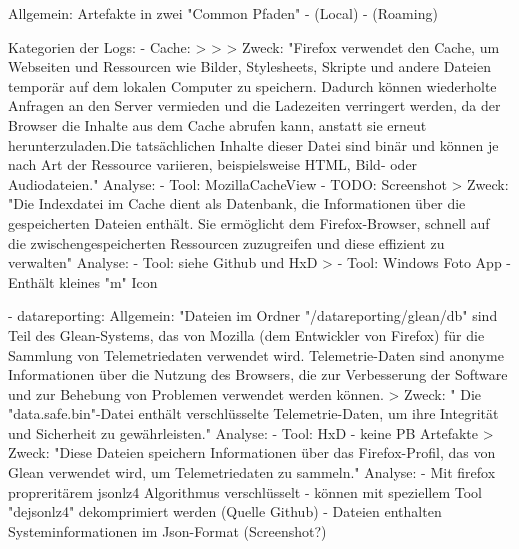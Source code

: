 Allgemein: Artefakte in zwei "Common Pfaden"
-	(Local) %
-	(Roaming) %

Kategorien der Logs:
- Cache: 
	> %
	> %
	> %
	Zweck:
		"Firefox verwendet den Cache, um Webseiten und Ressourcen wie Bilder, Stylesheets, Skripte und andere Dateien temporär auf dem lokalen Computer zu speichern. Dadurch können wiederholte Anfragen an den Server vermieden und die Ladezeiten verringert werden, da der Browser die Inhalte aus dem Cache abrufen kann, anstatt sie erneut herunterzuladen.Die tatsächlichen Inhalte dieser Datei sind binär und können je nach Art der Ressource variieren, beispielsweise HTML, Bild- oder Audiodateien."
	Analyse:
		- Tool: MozillaCacheView
		- TODO: Screenshot
	> %
		Zweck:
			"Die Indexdatei im Cache dient als Datenbank, die Informationen über die gespeicherten Dateien enthält. Sie ermöglicht dem Firefox-Browser, schnell auf die zwischengespeicherten Ressourcen zuzugreifen und diese effizient zu verwalten"
		Analyse:
			- Tool: siehe Github und HxD
	> %
		- Tool: Windows Foto App
		- Enthält kleines "m" Icon

- datareporting:
	Allgemein: "Dateien im Ordner "/datareporting/glean/db" sind Teil des Glean-Systems, das von Mozilla (dem Entwickler von Firefox) für die Sammlung von Telemetriedaten verwendet wird. Telemetrie-Daten sind anonyme Informationen über die Nutzung des Browsers, die zur Verbesserung der Software und zur Behebung von Problemen verwendet werden können. %
	> %
	Zweck:
		" Die "data.safe.bin"-Datei enthält verschlüsselte Telemetrie-Daten, um ihre Integrität und Sicherheit zu gewährleisten."
	Analyse:
		- Tool: HxD
		- keine PB Artefakte
	> %
	Zweck:
		"Diese Dateien speichern Informationen über das Firefox-Profil, das von Glean verwendet wird, um Telemetriedaten zu sammeln."
	Analyse:
		- Mit firefox propreritärem jsonlz4 Algorithmus verschlüsselt
		- können mit speziellem Tool "dejsonlz4" dekomprimiert werden (Quelle Github)
		- Dateien enthalten Systeminformationen im Json-Format (Screenshot?)

